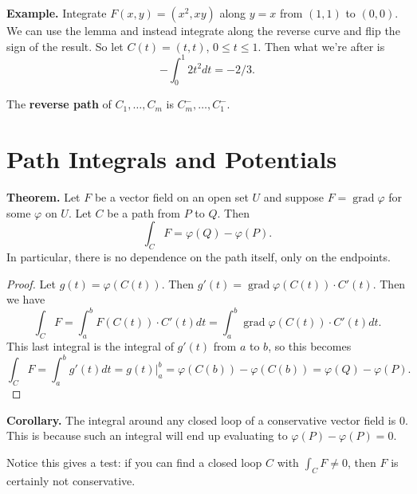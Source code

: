 \documentclass{article}
\DeclareMathOperator{\grd}{grad}
\begin{document}
\textbf{Example.} Integrate $F(x,y) = (x^2,xy)$ along $y=x$
from $(1,1)$ to $(0,0)$. We can use the lemma and instead integrate 
along the reverse curve and flip the sign of the result. So let $C(t) = (t,t)$, 
$0 \leq t \leq 1$. Then what we're after is 
\[-\int_0^1 2t^2 dt = -2/3.\]

The \textbf{reverse path} of $C_1, \ldots, C_m$ is 
$C_m^-, \ldots, C_1^-$.

\section*{Path Integrals and Potentials}

\textbf{Theorem.} Let $F$ be a vector field on an open set $U$ and
suppose $F = \grd \varphi$ for some $\varphi$ on $U$. Let $C$
be a path from $P$ to $Q$. Then 
\[\int_C F = \varphi(Q) - \varphi(P).\]
In particular, there is no dependence on the path itself, only
on the endpoints.
\begin{proof}
    Let $g(t) = \varphi(C(t))$. Then $g'(t) = \grd \varphi(C(t))\cdot C'(t)$.
    Then we have
    \[\int_C F = \int_a^b F(C(t))\cdot C'(t)dt = \int_a^b \grd \varphi(C(t))\cdot C'(t)dt.\]
    This last integral is the integral of $g'(t)$ from $a$ to $b$, so this becomes 
    \[\int_C F = \int_a^b g'(t) dt = g(t) \bigg\vert_a^b = \varphi(C(b)) - \varphi(C(b)) = \varphi(Q) - \varphi(P).\]
\end{proof}

\textbf{Corollary.} The integral around any closed loop of a conservative vector
field is $0$. This is because such an integral will end up evaluating to $\varphi(P) - \varphi(P) = 0$.

Notice this gives a test: if you can find a closed loop $C$ with $\int_C F \neq 0$,
then $F$ is certainly not conservative.
\end{document}
